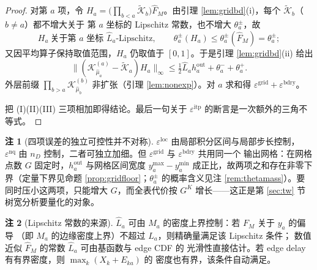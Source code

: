 \documentclass[a4paper,11pt]{article}
\theoremstyle{definition}
\newtheorem{remark}{注}
\newcommand{\1}{\mathbf 1}
\begin{document}
\begin{proof}
对第 $a$ 项，令
$H_a=\bigl(\prod_{b<a}\widetilde{\mathcal K}_b\bigr)\widehat F_M$。由引理
\ref{lem:gridbd}(i)，每个 $\widetilde{\mathcal K}_b$（$b\ne a$）都不增大关于
第 $a$ 坐标的 Lipschitz 常数，也不增大 $\theta_a^{\pm}$，故
\[
H_a\ \text{关于第 $a$ 坐标 $\widehat L_a$-Lipschitz},
\qquad
\theta_a^{\pm}(H_a)\le\theta_a^{\pm}(\widehat F_M)=\theta_a^{\pm};
\]
又因平均算子保持取值范围，$H_a$ 仍取值于 $[0,1]$。于是引理
\ref{lem:gridbd}(ii) 给出
\[
\bigl\|(\mathcal K_{\widehat\mu_a}^{(a)}-\widetilde{\mathcal K}_a)H_a
\bigr\|_\infty
\le
\tfrac12\widehat L_ah_a^{\mathrm{out}}+\theta_a^-+\theta_a^+ .
\]
外层前缀 $\prod_{b>a}\mathcal K_{\widehat\mu_b}^{(b)}$ 非扩张（引理
\ref{lem:nonexp}）。对 $a$ 求和得
$\varepsilon^{\mathrm{grid}}+\varepsilon^{\mathrm{bdry}}$。

把 (I)(II)(III) 三项相加即得结论。最后一句关于 $\varepsilon^{\mathrm{itp}}$
的断言是一次额外的三角不等式。
\end{proof}

\begin{remark}[四项误差的独立可控性并不对称]
\label{rem:budgetknobs}
$\varepsilon^{\mathrm{loc}}$ 由局部积分区间与局部步长控制，
$\varepsilon^{\mathrm{nq}}$ 由 $n_D$ 控制，二者可独立加细。但
$\varepsilon^{\mathrm{grid}}$ 与 $\varepsilon^{\mathrm{bdry}}$ 共用同一个
输出网格：在网格点数 $G$ 固定时，$h_a^{\mathrm{out}}$ 与网格区间宽度
$y_a^{\max}-y_a^{\min}$ 成正比，故两项之和存在非零下界（定量下界见命题
\ref{prop:gridfloor}；$\theta_a^\pm$ 的概率含义见注
\ref{rem:thetamass}）。要同时压小这两项，只能增大 $G$，而全表代价按
$G^K$ 增长——这正是第 \ref{sec:tw} 节树宽分析要量化的对象。
\end{remark}

\begin{remark}[Lipschitz 常数的来源]
$\widehat L_a$ 可由 $M_a$ 的密度上界控制：若 $F_M$ 关于 $y_a$ 的偏导
（即 $M_a$ 的边缘密度上界）不超过 $L_a$，则精确量满足该 Lipschitz 条件；
数值近似 $\widehat F_M$ 的常数 $\widehat L_a$ 可由基函数与 edge CDF 的
光滑性直接估计。若 edge delay 有有界密度，则 $\max_k(X_k+E_{ka})$ 的
密度也有界，该条件自动满足。
\end{remark}
\end{document}
